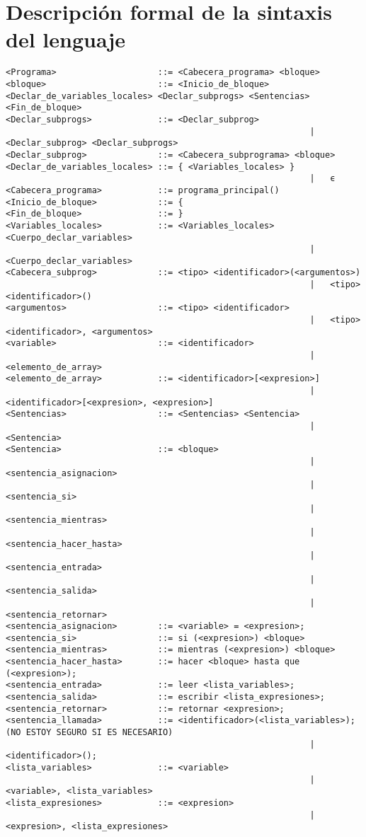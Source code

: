\section{Descripción formal de la sintaxis del lenguaje}

\begin{verbatim}
<Programa>                    ::= <Cabecera_programa> <bloque>
<bloque>                      ::= <Inicio_de_bloque> <Declar_de_variables_locales> <Declar_subprogs> <Sentencias> <Fin_de_bloque>
<Declar_subprogs>             ::= <Declar_subprog>
															| 	<Declar_subprog> <Declar_subprogs>
<Declar_subprog>              ::= <Cabecera_subprograma> <bloque>
<Declar_de_variables_locales> ::= { <Variables_locales> } 
															| 	ϵ
<Cabecera_programa>           ::= programa_principal()
<Inicio_de_bloque>            ::= {
<Fin_de_bloque>               ::= }
<Variables_locales>           ::= <Variables_locales> <Cuerpo_declar_variables>
															| 	<Cuerpo_declar_variables>
<Cabecera_subprog>            ::= <tipo> <identificador>(<argumentos>)
															| 	<tipo> <identificador>()
<argumentos>                  ::= <tipo> <identificador>
															| 	<tipo> <identificador>, <argumentos>
<variable>                    ::= <identificador>
															| 	<elemento_de_array>
<elemento_de_array>           ::= <identificador>[<expresion>]
															| 	<identificador>[<expresion>, <expresion>]
<Sentencias>                  ::= <Sentencias> <Sentencia>
															| 	<Sentencia>
<Sentencia>                   ::= <bloque>
															| 	<sentencia_asignacion>
															| 	<sentencia_si>
															| 	<sentencia_mientras>
															| 	<sentencia_hacer_hasta>
															| 	<sentencia_entrada>
															| 	<sentencia_salida>
															| 	<sentencia_retornar>
<sentencia_asignacion>        ::= <variable> = <expresion>;
<sentencia_si>                ::= si (<expresion>) <bloque>
<sentencia_mientras>          ::= mientras (<expresion>) <bloque>
<sentencia_hacer_hasta>       ::= hacer <bloque> hasta que (<expresion>);
<sentencia_entrada>           ::= leer <lista_variables>;
<sentencia_salida>            ::= escribir <lista_expresiones>;
<sentencia_retornar>          ::= retornar <expresion>;
<sentencia_llamada>           ::= <identificador>(<lista_variables>); (NO ESTOY SEGURO SI ES NECESARIO) 
															| 	<identificador>();
<lista_variables>             ::= <variable>
															| 	<variable>, <lista_variables>
<lista_expresiones>           ::= <expresion>
															| 	<expresion>, <lista_expresiones>

\end{verbatim}

